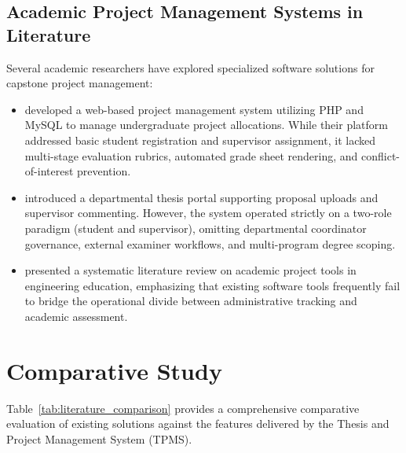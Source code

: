 \subsection{Academic Project Management Systems in Literature}
Several academic researchers have explored specialized software solutions for capstone project management:
\begin{itemize}
    \item \citet{kaur2014design} developed a web-based project management system utilizing PHP and MySQL to manage undergraduate project allocations. While their platform addressed basic student registration and supervisor assignment, it lacked multi-stage evaluation rubrics, automated grade sheet rendering, and conflict-of-interest prevention.
    \item \citet{sharma2019web} introduced a departmental thesis portal supporting proposal uploads and supervisor commenting. However, the system operated strictly on a two-role paradigm (student and supervisor), omitting departmental coordinator governance, external examiner workflows, and multi-program degree scoping.
    \item \citet{ko2021systematic} presented a systematic literature review on academic project tools in engineering education, emphasizing that existing software tools frequently fail to bridge the operational divide between administrative tracking and academic assessment.
\end{itemize}

\section{Comparative Study}
Table~\ref{tab:literature_comparison} provides a comprehensive comparative evaluation of existing solutions against the features delivered by the Thesis and Project Management System (TPMS).

